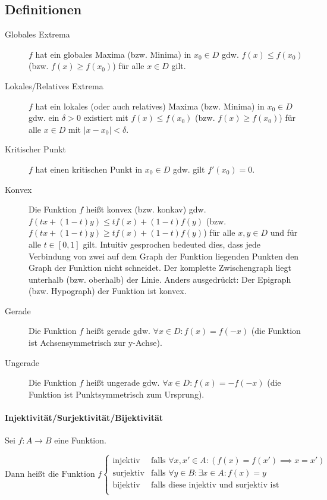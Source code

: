        \subsection{Definitionen}
            \begin{description}
                \item[Globales Extrema] $ f $ hat ein globales Maxima (bzw. Minima) in $ x _ 0 \in D $ gdw. $ f(x) \leq f(x _ 0) $ (bzw. $ f(x) \geq f(x _ 0) $) für alle $ x \in D $ gilt.
                \item[Lokales/Relatives Extrema] $ f $ hat ein lokales (oder auch relatives) Maxima (bzw. Minima) in $ x _ 0 \in D $ gdw. ein $ \delta > 0 $ existiert mit $ f(x) \leq f(x _ 0) $ (bzw. $ f(x) \geq f(x _ 0) $) für alle $ x \in D $ mit $ \lvert x - x _ 0 \rvert < \delta $.
                \item[Kritischer Punkt] $ f $ hat einen kritischen Punkt in $ x _ 0 \in D $ gdw. gilt $ f'(x _ 0) = 0 $.
                \item[Konvex] Die Funktion $ f $ heißt konvex (bzw. konkav) gdw. $ f(tx + (1 - t)y) \leq tf(x) + (1 - t)f(y) $ (bzw. $ f(tx + (1 - t)y) \geq tf(x) + (1 - t)f(y) $) für alle $ x, y \in D $ und für alle $ t \in [0, 1] $ gilt. Intuitiv gesprochen bedeuted dies, dass jede Verbindung von zwei auf dem Graph der Funktion liegenden Punkten den Graph der Funktion nicht schneidet. Der komplette Zwischengraph liegt unterhalb (bzw. oberhalb) der Linie. Anders ausgedrückt: Der Epigraph (bzw. Hypograph) der Funktion ist konvex.
                \item[Gerade] Die Funktion $ f $ heißt gerade gdw. $ \forall x \in D : f(x) = f(-x) $ (die Funktion ist Achsensymmetrisch zur y-Achse).
                \item[Ungerade] Die Funktion $ f $ heißt ungerade gdw. $ \forall x \in D : f(x) = -f(-x) $ (die Funktion ist Punktsymmetrisch zum Ursprung).
            \end{description}

            \paragraph{Injektivität/Surjektivität/Bijektivität}
                Sei $ f : A \rightarrow B $ eine Funktion.

                \begin{equation*}
                    \text{Dann heißt die Funktion } f
                    \begin{cases}
                        \text{injektiv} & \text{falls } \forall x, x' \in A : (f(x) = f(x') \implies x = x') \\
                        \text{surjektiv} & \text{falls } \forall y \in B : \exists x \in A : f(x) = y \\
                        \text{bijektiv} & \text{falls diese injektiv und surjektiv ist} \\
                    \end{cases}
                \end{equation*}

